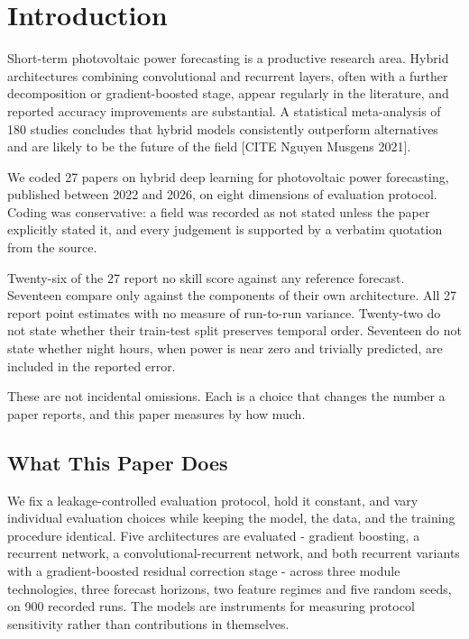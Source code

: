 \section{Introduction}

Short-term photovoltaic power forecasting is a productive research area.
Hybrid architectures combining convolutional and recurrent layers, often
with a further decomposition or gradient-boosted stage, appear regularly
in the literature, and reported accuracy improvements are substantial.
A statistical meta-analysis of 180 studies concludes that hybrid models
consistently outperform alternatives and are likely to be the future of
the field [CITE Nguyen Musgens 2021].

We coded 27 papers on hybrid deep learning for photovoltaic power
forecasting, published between 2022 and 2026, on eight dimensions of
evaluation protocol. Coding was conservative: a field was recorded as
not stated unless the paper explicitly stated it, and every judgement is
supported by a verbatim quotation from the source.

Twenty-six of the 27 report no skill score against any reference
forecast. Seventeen compare only against the components of their own
architecture. All 27 report point estimates with no measure of
run-to-run variance. Twenty-two do not state whether their train-test
split preserves temporal order. Seventeen do not state whether night
hours, when power is near zero and trivially predicted, are included in
the reported error.

These are not incidental omissions. Each is a choice that changes the
number a paper reports, and this paper measures by how much.

\subsection{What This Paper Does}

We fix a leakage-controlled evaluation protocol, hold it constant, and
vary individual evaluation choices while keeping the model, the data,
and the training procedure identical. Five architectures are evaluated -
gradient boosting, a recurrent network, a convolutional-recurrent
network, and both recurrent variants with a gradient-boosted residual
correction stage - across three module technologies, three forecast
horizons, two feature regimes and five random seeds, on 900 recorded
runs. The models are instruments for measuring protocol sensitivity
rather than contributions in themselves.

